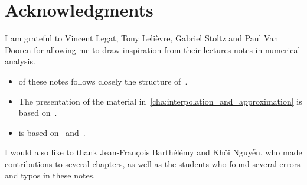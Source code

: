 \chapter*{Acknowledgments}%
\label{cha:acknowledgements}

I am grateful to Vincent Legat, Tony Lelièvre, Gabriel Stoltz and Paul Van Dooren for allowing me to draw inspiration from their lectures notes in numerical analysis.
\begin{itemize}
    \item
         of these notes follows closely the structure of~\cite[Chapter 3]{VanDooren}.

    \item
        The presentation of the material in~\cref{cha:interpolation_and_approximation} is based on~\cite{Legat}.

    \item
         is based on~\cite[Chapter 2]{cs} and~\cite[Chapter 5]{VanDooren}.

\end{itemize}
I would also like to thank Jean-François Barthélémy and Kh\^oi Nguy\~{\^e}n,
who made contributions to several chapters,
as well as the students who found several errors and typos in these notes.

